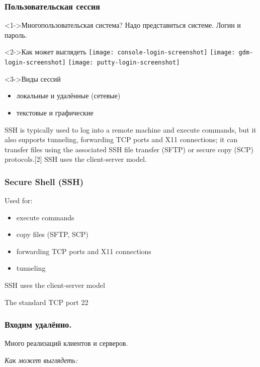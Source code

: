 \begin{frame}
  \frametitle{Пользовательская сессия}

  \begin{center}
    \begin{block}<1->{Многопользовательская система?}
      Надо представиться системе. Логин и пароль.
    \end{block}

    \begin{block}<2->{Как может выглядеть}
      \texttt{[image: console-login-screenshot]}
      \texttt{[image: gdm-login-screenshot]}
      \texttt{[image: putty-login-screenshot]}
    \end{block}

    \begin{block}<3->{Виды сессий}
      \begin{itemize}
        \item локальные и удалённые (сетевые)
        \item текстовые и графические
      \end{itemize}
    \end{block}

  \end{center}

\end{frame}

SSH is typically used to log into a remote machine and execute commands, but it also supports tunneling, forwarding TCP ports and X11 connections; it can transfer files using the associated SSH file transfer (SFTP) or secure copy (SCP) protocols.[2] SSH uses the client-server model.

\begin{frame}[fragile]
	\frametitle{Secure Shell (SSH)}
	Used for:
      \begin{itemize}
        \item execute commands 
        \item copy files (SFTP, SCP)
        \item forwarding TCP ports and X11 connections
        \item tunneling
      \end{itemize}
	SSH uses the client-server model

	The standard TCP port 22 
\end{frame}

\begin{frame}[fragile]
  \frametitle{Входим удалённо.}

    Много реализаций клиентов и серверов.

    \emph{Как может выглядеть:}
    \newline
    \emph{ }

\end{frame}

